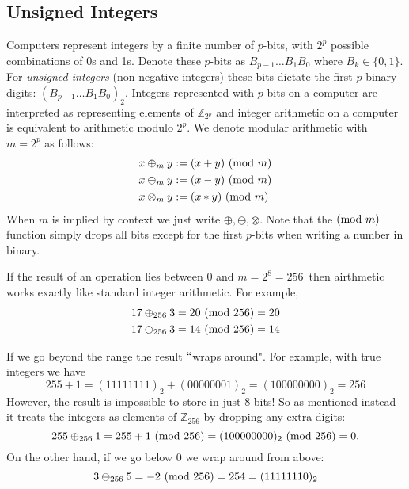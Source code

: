 \subsection{Unsigned Integers}
Computers represent integers by a finite number of $p$-bits, with $2^p$ possible combinations of 0s and 1s. Denote these $p$-bits as $B_{p-1}\ensuremath{\ldots}B_1B_0$ where $B_k \ensuremath{\in} \{0,1\}$. For \emph{unsigned integers} (non-negative integers) these bits dictate the first $p$ binary digits: $(B_{p-1}\ldots B_1B_0)_2$. Integers represented with $p$-bits on a computer are interpreted as  representing elements of ${\mathbb Z}_{2^p}$ and integer arithmetic on a computer is equivalent to arithmetic modulo $2^p$. We denote modular arithmetic with $m = 2^p$ as follows:
\begin{align*}
x \ensuremath{\oplus}_m y &:= (x+y)\ ({\rm mod}\ m) \\
x \ensuremath{\ominus}_m y &:= (x-y)\ ({\rm mod}\ m) \\
x \ensuremath{\otimes}_m y &:= (x*y)\ ({\rm mod}\ m)
\end{align*}
When $m$ is implied by context we just write $\ensuremath{\oplus}, \ensuremath{\ominus}, \ensuremath{\otimes}$. Note that  the $({\rm mod}\ m)$ function simply drops all bits except for the first $p$-bits when writing a number in binary.

\begin{example} If  the result of an operation lies between $0$ and $m = 2^8 = 256$ then airthmetic works exactly like standard integer arithmetic. For example,
\begin{align*}
17 \ensuremath{\oplus}_{256} 3 = 20\ ({\rm mod}\ 256) = 20 \\
17 \ensuremath{\ominus}_{256} 3 = 14\ ({\rm mod}\ 256) = 14
\end{align*}
\end{example}

\begin{example} If we go beyond the range the result \ensuremath{\ldq}wraps around". For example, with true integers we have
\[
255 + 1 = (11111111)_2 + (00000001)_2 = (100000000)_2 = 256
\]
However, the result is impossible to store in just 8-bits! So as mentioned instead it treats the integers as elements of ${\mathbb Z}_{256}$ by dropping any extra digits:
\[
255 \ensuremath{\oplus}_{256} 1 = 255 + 1 \ ({\rm mod}\ 256) = (100000000)_2 \ ({\rm mod}\ 256) = 0.
\]
On the other hand, if we go below $0$ we wrap around from above:
\[
3 \ensuremath{\ominus}_{256} 5 = -2\ ({\rm mod}\ 256) = 254 = (11111110)_2
\]
\end{example}

